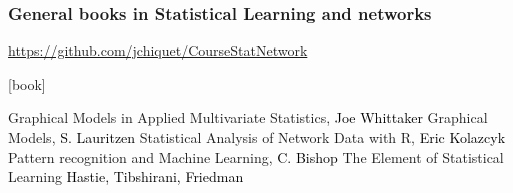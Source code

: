\documentclass{beamer}\usepackage[]{graphicx}\usepackage[]{color}
\begin{document}
  \begin{frame}
    \frametitle{General books in Statistical Learning and networks}

    \url{https://github.com/jchiquet/CourseStatNetwork} 

    \vfill
    
    \begin{thebibliography}{99}
      [book]

     Graphical Models in Applied Multivariate Statistics, \textcolor{black}{Joe Whittaker}
     Graphical Models, \textcolor{black}{S. Lauritzen}
     Statistical Analysis of Network Data with R, \textcolor{black}{Eric Kolazcyk}
     Pattern recognition and Machine Learning, \textcolor{black}{C. Bishop}
     The Element of Statistical Learning \textcolor{black}{Hastie, Tibshirani, Friedman}
    \end{thebibliography}

  \end{frame}

\end{document}
